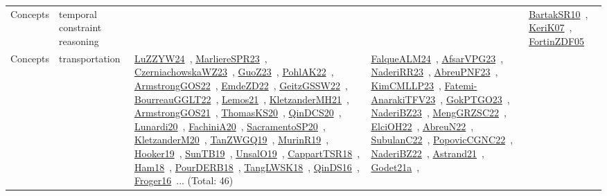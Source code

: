 {\begin{longtable}{lp{3cm}>{\raggedright\arraybackslash}p{6cm}>{\raggedright\arraybackslash}p{6cm}>{\raggedright\arraybackslash}p{8cm}}
Concepts & temporal constraint reasoning &  &  & \href{../works/BartakSR10.pdf}{BartakSR10}~\cite{BartakSR10}, \href{../works/KeriK07.pdf}{KeriK07}~\cite{KeriK07}, \href{../works/FortinZDF05.pdf}{FortinZDF05}~\cite{FortinZDF05}\\
Concepts & transportation & \href{../works/LuZZYW24.pdf}{LuZZYW24}~\cite{LuZZYW24}, \href{../works/MarliereSPR23.pdf}{MarliereSPR23}~\cite{MarliereSPR23}, \href{../works/CzerniachowskaWZ23.pdf}{CzerniachowskaWZ23}~\cite{CzerniachowskaWZ23}, \href{../works/GuoZ23.pdf}{GuoZ23}~\cite{GuoZ23}, \href{../works/PohlAK22.pdf}{PohlAK22}~\cite{PohlAK22}, \href{../works/ArmstrongGOS22.pdf}{ArmstrongGOS22}~\cite{ArmstrongGOS22}, \href{../works/EmdeZD22.pdf}{EmdeZD22}~\cite{EmdeZD22}, \href{../works/GeitzGSSW22.pdf}{GeitzGSSW22}~\cite{GeitzGSSW22}, \href{../works/BourreauGGLT22.pdf}{BourreauGGLT22}~\cite{BourreauGGLT22}, \href{../works/Lemos21.pdf}{Lemos21}~\cite{Lemos21}, \href{../works/KletzanderMH21.pdf}{KletzanderMH21}~\cite{KletzanderMH21}, \href{../works/ArmstrongGOS21.pdf}{ArmstrongGOS21}~\cite{ArmstrongGOS21}, \href{../works/ThomasKS20.pdf}{ThomasKS20}~\cite{ThomasKS20}, \href{../works/QinDCS20.pdf}{QinDCS20}~\cite{QinDCS20}, \href{../works/Lunardi20.pdf}{Lunardi20}~\cite{Lunardi20}, \href{../works/FachiniA20.pdf}{FachiniA20}~\cite{FachiniA20}, \href{../works/SacramentoSP20.pdf}{SacramentoSP20}~\cite{SacramentoSP20}, \href{../works/KletzanderM20.pdf}{KletzanderM20}~\cite{KletzanderM20}, \href{../works/TanZWGQ19.pdf}{TanZWGQ19}~\cite{TanZWGQ19}, \href{../works/MurinR19.pdf}{MurinR19}~\cite{MurinR19}, \href{../works/Hooker19.pdf}{Hooker19}~\cite{Hooker19}, \href{../works/SunTB19.pdf}{SunTB19}~\cite{SunTB19}, \href{../works/UnsalO19.pdf}{UnsalO19}~\cite{UnsalO19}, \href{../works/CappartTSR18.pdf}{CappartTSR18}~\cite{CappartTSR18}, \href{../works/Ham18.pdf}{Ham18}~\cite{Ham18}, \href{../works/PourDERB18.pdf}{PourDERB18}~\cite{PourDERB18}, \href{../works/TangLWSK18.pdf}{TangLWSK18}~\cite{TangLWSK18}, \href{../works/QinDS16.pdf}{QinDS16}~\cite{QinDS16}, \href{../works/Froger16.pdf}{Froger16}~\cite{Froger16}... (Total: 46) & \href{../works/FalqueALM24.pdf}{FalqueALM24}~\cite{FalqueALM24}, \href{../works/AfsarVPG23.pdf}{AfsarVPG23}~\cite{AfsarVPG23}, \href{../works/NaderiRR23.pdf}{NaderiRR23}~\cite{NaderiRR23}, \href{../works/AbreuPNF23.pdf}{AbreuPNF23}~\cite{AbreuPNF23}, \href{../works/KimCMLLP23.pdf}{KimCMLLP23}~\cite{KimCMLLP23}, \href{../works/Fatemi-AnarakiTFV23.pdf}{Fatemi-AnarakiTFV23}~\cite{Fatemi-AnarakiTFV23}, \href{../works/GokPTGO23.pdf}{GokPTGO23}~\cite{GokPTGO23}, \href{../works/NaderiBZ23.pdf}{NaderiBZ23}~\cite{NaderiBZ23}, \href{../works/MengGRZSC22.pdf}{MengGRZSC22}~\cite{MengGRZSC22}, \href{../works/ElciOH22.pdf}{ElciOH22}~\cite{ElciOH22}, \href{../works/AbreuN22.pdf}{AbreuN22}~\cite{AbreuN22}, \href{../works/SubulanC22.pdf}{SubulanC22}~\cite{SubulanC22}, \href{../works/PopovicCGNC22.pdf}{PopovicCGNC22}~\cite{PopovicCGNC22}, \href{../works/NaderiBZ22.pdf}{NaderiBZ22}~\cite{NaderiBZ22}, \href{../works/Astrand21.pdf}{Astrand21}~\cite{Astrand21}, \href{../works/Godet21a.pdf}{Godet21a}~\cite{Godet21a}, 
\end{longtable}}
